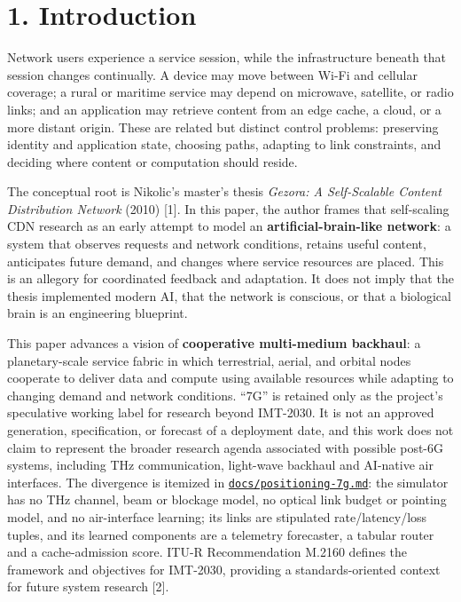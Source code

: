 \documentclass[
  american,
  11pt,
]{article}
\begin{document}
\section{1. Introduction}\label{introduction}

Network users experience a service session, while the infrastructure
beneath that session changes continually. A device may move between
Wi-Fi and cellular coverage; a rural or maritime service may depend on
microwave, satellite, or radio links; and an application may retrieve
content from an edge cache, a cloud, or a more distant origin. These are
related but distinct control problems: preserving identity and
application state, choosing paths, adapting to link constraints, and
deciding where content or computation should reside.

The conceptual root is Nikolic's master's thesis \emph{Gezora: A
Self-Scalable Content Distribution Network} (2010) {[}1{]}. In this
paper, the author frames that self-scaling CDN research as an early
attempt to model an \textbf{artificial-brain-like network}: a system
that observes requests and network conditions, retains useful content,
anticipates future demand, and changes where service resources are
placed. This is an allegory for coordinated feedback and adaptation. It
does not imply that the thesis implemented modern AI, that the network
is conscious, or that a biological brain is an engineering blueprint.

This paper advances a vision of \textbf{cooperative multi-medium
backhaul}: a planetary-scale service fabric in which terrestrial,
aerial, and orbital nodes cooperate to deliver data and compute using
available resources while adapting to changing demand and network
conditions. ``7G'' is retained only as the project's speculative working
label for research beyond IMT-2030. It is not an approved generation,
specification, or forecast of a deployment date, and this work does not
claim to represent the broader research agenda associated with possible
post-6G systems, including THz communication, light-wave backhaul and
AI-native air interfaces. The divergence is itemized in
\href{../docs/positioning-7g.md}{\texttt{docs/positioning-7g.md}}: the
simulator has no THz channel, beam or blockage model, no optical link
budget or pointing model, and no air-interface learning; its links are
stipulated rate/latency/loss tuples, and its learned components are a
telemetry forecaster, a tabular router and a cache-admission score.
ITU-R Recommendation M.2160 defines the framework and objectives for
IMT-2030, providing a standards-oriented context for future system
research {[}2{]}.
\end{document}
